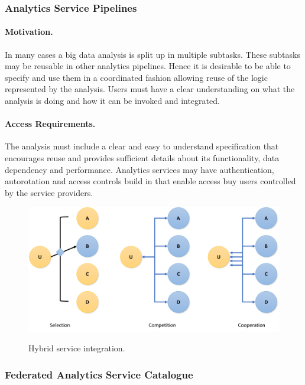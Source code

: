 
\subsubsection{Analytics Service Pipelines}

\paragraph{Motivation.}
In many cases a big data analysis is split up in multiple
subtasks. These subtasks may be reusable in other analytics
pipelines. Hence it is desirable to be able to specify and use them in
a coordinated fashion allowing reuse of the logic represented by the
analysis. Users must have a clear understanding on what the analysis
is doing and how it can be invoked and integrated.

\paragraph{Access Requirements.}
The analysis must include a clear and easy to understand specification
that encourages reuse and provides sufficient details about its
functionality, data dependency and performance. Analytics services may
have authentication, autorotation and access controls build in that
enable access buy users controlled by the service providers.




\begin{figure}[htb]
\centering\includegraphics[width=1.0\columnwidth]{images/NIST-AI-services-workflow.pdf}
\label{fig:hvac-2}
\caption{Hybrid service integration.}
\end{figure}


\subsubsection{Federated Analytics Service Catalogue}
